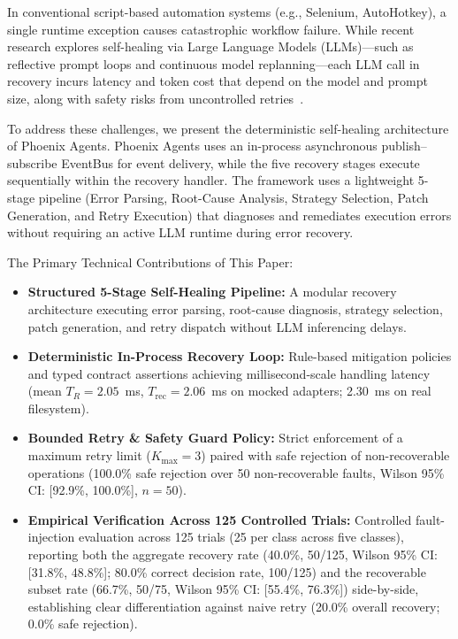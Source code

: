\documentclass[conference]{IEEEtran}
\begin{document}
In conventional script-based automation systems (e.g., Selenium, AutoHotkey), a single runtime exception causes catastrophic workflow failure. While recent research explores self-healing via Large Language Models (LLMs)---such as reflective prompt loops and continuous model replanning---each LLM call in recovery incurs latency and token cost that depend on the model and prompt size, along with safety risks from uncontrolled retries~\cite{babu2026,jeong2026}.

To address these challenges, we present the deterministic self-healing architecture of Phoenix Agents. Phoenix Agents uses an in-process asynchronous publish--subscribe EventBus for event delivery, while the five recovery stages execute sequentially within the recovery handler. The framework uses a lightweight 5-stage pipeline (Error Parsing, Root-Cause Analysis, Strategy Selection, Patch Generation, and Retry Execution) that diagnoses and remediates execution errors without requiring an active LLM runtime during error recovery.

The Primary Technical Contributions of This Paper:
\begin{itemize}
    \item \textbf{Structured 5-Stage Self-Healing Pipeline:} A modular recovery architecture executing error parsing, root-cause diagnosis, strategy selection, patch generation, and retry dispatch without LLM inferencing delays.
    \item \textbf{Deterministic In-Process Recovery Loop:} Rule-based mitigation policies and typed contract assertions achieving millisecond-scale handling latency (mean $T_R = 2.05$~ms, $T_{\text{rec}} = 2.06$~ms on mocked adapters; 2.30~ms on real filesystem).
    \item \textbf{Bounded Retry \& Safety Guard Policy:} Strict enforcement of a maximum retry limit ($K_{\text{max}} = 3$) paired with safe rejection of non-recoverable operations (100.0\% safe rejection over 50 non-recoverable faults, Wilson 95\% CI: [92.9\%, 100.0\%], $n=50$).
    \item \textbf{Empirical Verification Across 125 Controlled Trials:} Controlled fault-injection evaluation across 125 trials (25 per class across five classes), reporting both the aggregate recovery rate (40.0\%, 50/125, Wilson 95\% CI: [31.8\%, 48.8\%]; 80.0\% correct decision rate, 100/125) and the recoverable subset rate (66.7\%, 50/75, Wilson 95\% CI: [55.4\%, 76.3\%]) side-by-side, establishing clear differentiation against naive retry (20.0\% overall recovery; 0.0\% safe rejection).
\end{itemize}
\end{document}
